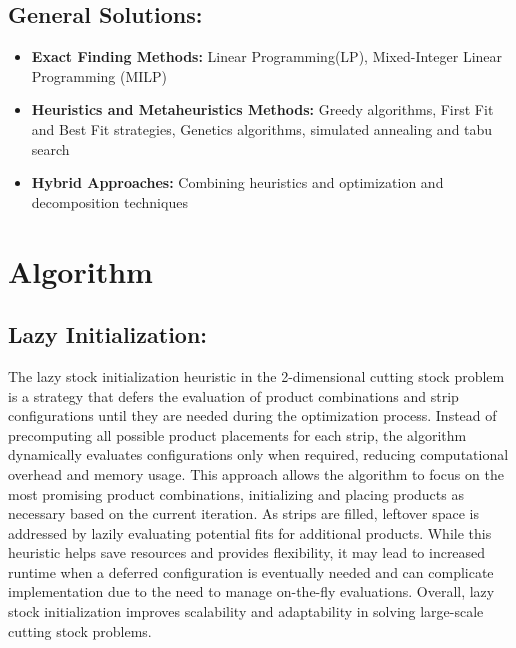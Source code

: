 \documentclass[a4paper]{article}
\begin{document}
\subsection{General Solutions: }
\begin{itemize}
    \item \textbf{Exact Finding Methods:} Linear Programming(LP), Mixed-Integer Linear Programming (MILP)
    \item \textbf{Heuristics and Metaheuristics Methods:} Greedy algorithms, First Fit and Best Fit strategies, Genetics algorithms, simulated annealing and tabu search
    \item \textbf{Hybrid Approaches:} Combining heuristics and optimization and decomposition techniques
\end{itemize}
\section{Algorithm} 
\subsection{Lazy Initialization:}
The lazy stock initialization heuristic in the 2-dimensional cutting stock problem is a strategy that defers the evaluation of product combinations and strip configurations until they are needed during the optimization process. Instead of precomputing all possible product placements for each strip, the algorithm dynamically evaluates configurations only when required, reducing computational overhead and memory usage. This approach allows the algorithm to focus on the most promising product combinations, initializing and placing products as necessary based on the current iteration. As strips are filled, leftover space is addressed by lazily evaluating potential fits for additional products. While this heuristic helps save resources and provides flexibility, it may lead to increased runtime when a deferred configuration is eventually needed and can complicate implementation due to the need to manage on-the-fly evaluations. Overall, lazy stock initialization improves scalability and adaptability in solving large-scale cutting stock problems.
\end{document}
